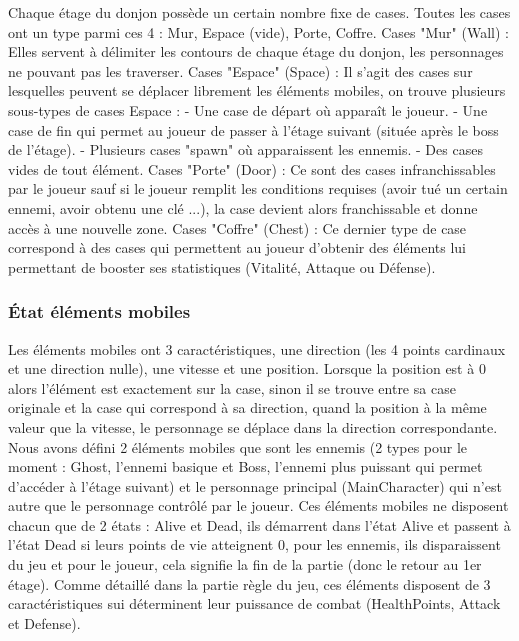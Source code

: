 \documentclass[a4paper,12pt]{article}
\begin{document}
Chaque étage du donjon possède un certain nombre fixe de cases. Toutes les cases ont un type parmi ces 4 : Mur, Espace (vide), Porte, Coffre.
\bigbreak
Cases "Mur" (Wall) : Elles servent à délimiter les contours de chaque étage du donjon, les personnages ne pouvant pas les traverser.
\bigbreak
Cases "Espace" (Space) : Il s'agit des cases sur lesquelles peuvent se déplacer librement les éléments mobiles, on trouve plusieurs sous-types de cases Espace :
- Une case de départ où apparaît le joueur.
- Une case de fin qui permet au joueur de passer à l'étage suivant (située après le boss de l'étage).
- Plusieurs cases "spawn" où apparaissent les ennemis.
- Des cases vides de tout élément.
\bigbreak
Cases "Porte" (Door) : Ce sont des cases infranchissables par le joueur sauf si le joueur remplit les conditions requises (avoir tué un certain ennemi, avoir obtenu une clé ...), la case devient alors franchissable et donne accès à une nouvelle zone.
\bigbreak
Cases "Coffre" (Chest) : Ce dernier type de case correspond à des cases qui permettent au joueur d'obtenir des éléments lui permettant de booster ses statistiques (Vitalité, Attaque ou Défense).

\subsubsection{État éléments mobiles}

Les éléments mobiles ont 3 caractéristiques, une direction (les 4 points cardinaux et une direction nulle), une vitesse et une position.
Lorsque la position est à 0 alors l'élément est exactement sur la case, sinon il se trouve entre sa case originale et la case qui correspond à sa direction, quand la position à la même valeur que la vitesse, le personnage se déplace dans la direction correspondante.
\bigbreak
Nous avons défini 2 éléments mobiles que sont les ennemis (2 types pour le moment : Ghost, l'ennemi basique et Boss, l'ennemi plus puissant qui permet d'accéder à l'étage suivant) et le personnage principal (MainCharacter) qui n'est autre que le personnage contrôlé par le joueur.
Ces éléments mobiles ne disposent chacun que de 2 états : Alive et Dead, ils démarrent dans l'état Alive et passent à l'état Dead si leurs points de vie atteignent 0, pour les ennemis, ils disparaissent du jeu et pour le joueur, cela signifie la fin de la partie (donc le retour au 1er étage).
Comme détaillé dans la partie règle du jeu, ces éléments disposent de 3 caractéristiques sui déterminent leur puissance de combat (HealthPoints, Attack et Defense).
\end{document}
